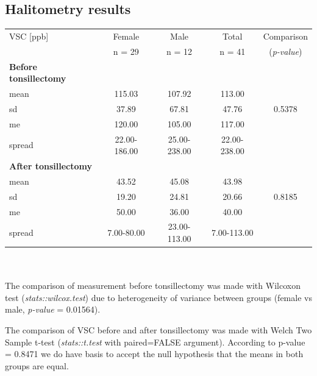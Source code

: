 \documentclass[12pt,a4paper,notitlepage]{report}
\begin{document}
\subsection{Halitometry results}
\noindent
\begin{tabular}{lcccc}
\hline VSC [ppb] 				& Female 	& Male 		& Total 		&  Comparison  \\
 		 					& n = 29 	& n = 12	& n = 41	&  (\textit{p-value}) \\
\hline
\bf{Before tonsillectomy}		&			&			&			&		\\
\indent mean				& 115.03	& 107.92	& 113.00	& 		\\
\indent sd					& 37.89		& 67.81		& 47.76		& 0.5378 \\
\indent me					& 120.00	& 105.00	& 117.00	& 		\\
\indent spread				& 22.00-186.00 & 25.00-238.00 & 22.00-238.00	 & \\
\hline

\bf{After tonsillectomy}		&			&			&			&		\\
\indent mean				& 43.52		& 45.08		& 43.98		& 		\\
\indent sd					& 19.20		& 24.81		& 20.66		& 0.8185 \\
\indent me					& 50.00		& 36.00		& 40.00 		& 		\\
\indent spread				& 7.00-80.00 & 23.00-113.00	& 7.00-113.00 & \\
\hline

\end{tabular} \\ \\

The comparison of measurement before tonsillectomy was made with Wilcoxon test (\textit{stats::wilcox.test}) due to heterogeneity of variance between groups (female vs male, \textit{p-value} = 0.01564). 

The comparison of VSC before and after tonsillectomy was made with Welch Two Sample t-test (\textit{stats::t.test} with paired=FALSE argument). According to p-value = 0.8471 we do have basis to accept the null hypothesis that the means in both groups are equal. 
\end{document}
